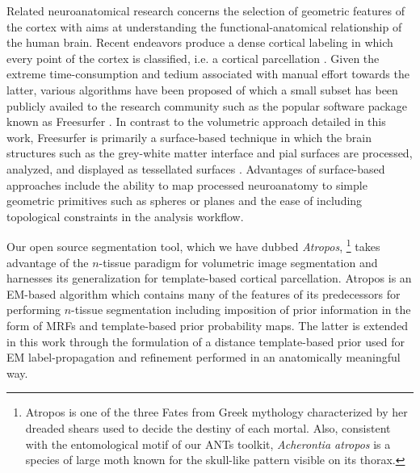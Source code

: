 \documentclass[11pt,english]{article}
\begin{document}
Related neuroanatomical research concerns the selection of geometric features of the cortex \citep[e.g.][]{Goualher1999} with aims at understanding the functional-anatomical relationship of the human brain. Recent endeavors produce a dense cortical labeling in which every point of the cortex is classified, i.e. a cortical parcellation \citep{Fischl2004,Heckemann2006,Destrieux2010}.  Given the extreme time-consumption and tedium associated with manual effort towards the latter, various algorithms have been proposed of which a small subset has been publicly availed to the research community such as the popular software package known as Freesurfer \citep{Dale1999,Fischl1999,Fischl2004}.  In contrast to the volumetric approach detailed in this work, Freesurfer is primarily a surface-based technique in which the brain structures such as the grey-white matter interface and pial surfaces are processed, analyzed, and displayed as tessellated surfaces  \cite{Dale1999,Fischl1999}.  Advantages of surface-based approaches include the ability to map processed neuroanatomy to simple geometric primitives such as spheres or planes and the ease of including topological constraints in the analysis workflow.  

{}


Our open source segmentation tool, which we have dubbed {\em Atropos},%
\footnote{
Atropos is one of the three Fates from Greek mythology characterized by her dreaded shears used to decide the destiny of each mortal.  Also, consistent with the entomological motif of our ANTs toolkit, {\it Acherontia atropos} is a species of large moth known for the skull-like pattern visible on its thorax.
}
takes advantage of the $n$-tissue paradigm for volumetric image segmentation and harnesses its generalization for template-based cortical parcellation.
Atropos is an EM-based algorithm which contains many of the features of its predecessors for performing
$n$-tissue segmentation including imposition of prior information in the form of MRFs and template-based prior probability maps.  The latter is extended in this work through the formulation of a distance template-based prior used for EM label-propagation and refinement performed in an anatomically meaningful way. 
\end{document}
